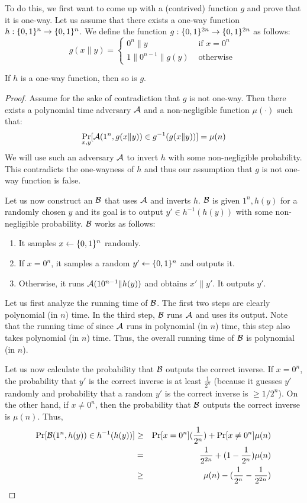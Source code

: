 To do this, we first want to come up with a (contrived) function $g$ and prove that it is one-way.
Let us assume that there exists a one-way function $h : \{0,1\}^n \rightarrow \{0,1\}^n$. We define the function $g : \{0,1\}^{2n} \rightarrow \{0,1\}^{2n}$ as follows:
$$
g(x\|y) = \begin{cases}
 0^{n}\|y &\text{    if } x = 0^n\\
1\|0^{n-1}\|g(y) &\text{    otherwise }
\end{cases}
$$
\begin{claim}
If $h$ is a one-way function, then so is $g$.
\end{claim}
\begin{proof}
Assume for the sake of contradiction that $g$ is not one-way. Then there exists a polynomial time adversary $\mathcal{A}$ and a non-negligible function $\mu(\cdot)$ such that:
$$
\Pr_{x,y}[\mathcal{A}(1^n,g(x\|y)) \in g^{-1}(g(x\|y))] = \mu(n)
$$
We will use such an adversary $\mathcal{A}$ to invert $h$ with some non-negligible probability. This contradicts the one-wayness of $h$ and thus our assumption that $g$ is not one-way function is false.

Let us now construct an $\mathcal{B}$ that uses $\mathcal{A}$ and inverts $h$. $\mathcal{B}$ is given $1^n,h(y)$ for a randomly chosen $y$ and its goal is to output $y' \in h^{-1}(h(y))$ with some non-negligible probability. $\mathcal{B}$ works as follows:
\begin{enumerate}
\item It samples $x \gets \{0,1\}^n$ randomly.
\item If $x = 0^n$, it samples a random $y' \gets \{0,1\}^n$ and outputs it.
\item Otherwise, it runs $\mathcal{A}(10^{n-1}\|h(y))$ and obtains $x' \| y'$. It outputs $y'$.
\end{enumerate}

Let us first analyze the running time of $\mathcal{B}$. The first two steps are clearly polynomial (in $n$) time. In the third step, $\mathcal{B}$ runs $\mathcal{A}$ and uses its output. Note that the running time of since $\mathcal{A}$ runs in polynomial (in $n$) time, this step also takes polynomial (in $n$) time. Thus, the overall running time of $\mathcal{B}$ is polynomial (in $n$).

Let us now calculate the probability that $\mathcal{B}$ outputs the correct inverse. If $x = 0^n$, the probability that $y'$ is the correct inverse is at least $\frac{1}{2^n}$ (because it guesses $y'$ randomly and probability that a random $y'$ is the correct inverse is $\geq 1/2^n$). On the other hand, if $x \neq 0^n$, then the probability that $\mathcal{B}$ outputs the correct inverse is $\mu(n)$. Thus,
\begin{eqnarray*}
\Pr[\mathcal{B}(1^n,h(y)) \in h^{-1}(h(y))] & \geq & \Pr[x = 0^n](\frac{1}{2^n}) + \Pr[x \neq 0^n]\mu(n)\\
& = & \frac{1}{2^{2n}} + (1 - \frac{1}{2^n}) \mu(n) \\
& \geq & \mu(n) - (\frac{1}{2^{n}} - \frac{1}{2^{2n}})
\end{eqnarray*}


\end{proof}
